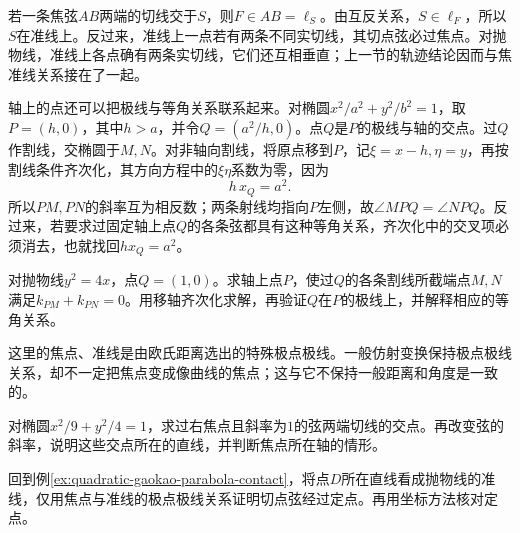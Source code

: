 若一条焦弦\(AB\)两端的切线交于\(S\)，则\(F\in AB=\ell_S\)。由互反关系，\(S\in\ell_F\)，所以\(S\)在准线上。反过来，准线上一点若有两条不同实切线，其切点弦必过焦点。对抛物线，准线上各点确有两条实切线，它们还互相垂直；上一节的轨迹结论因而与焦准线关系接在了一起。

轴上的点还可以把极线与等角关系联系起来。对椭圆\(x^2/a^2+y^2/b^2=1\)，取\(P=(h,0)\)，其中\(h>a\)，并令\(Q=(a^2/h,0)\)。点\(Q\)是\(P\)的极线与轴的交点。过\(Q\)作割线，交椭圆于\(M,N\)。对非轴向割线，将原点移到\(P\)，记\(\xi=x-h,\eta=y\)，再按割线条件齐次化，其方向方程中的\(\xi\eta\)系数为零，因为
\begin{equation*}
 h\,x_Q=a^2.
\end{equation*}
所以\(PM,PN\)的斜率互为相反数；两条射线均指向\(P\)左侧，故\(\angle MPQ=\angle NPQ\)。反过来，若要求过固定轴上点\(Q\)的各条弦都具有这种等角关系，齐次化中的交叉项必须消去，也就找回\(h x_Q=a^2\)。

\par\noindent\begin{minipage}{\linewidth}
\begin{example}
对抛物线\(y^2=4x\)，点\(Q=(1,0)\)。求轴上点\(P\)，使过\(Q\)的各条割线所截端点\(M,N\)满足\(k_{PM}+k_{PN}=0\)。用移轴齐次化求解，再验证\(Q\)在\(P\)的极线上，并解释相应的等角关系。
\end{example}
\end{minipage}\par

这里的焦点、准线是由欧氏距离选出的特殊极点极线。一般仿射变换保持极点极线关系，却不一定把焦点变成像曲线的焦点；这与它不保持一般距离和角度是一致的。

\par\noindent\begin{minipage}{\linewidth}
\begin{example}
对椭圆\(x^2/9+y^2/4=1\)，求过右焦点且斜率为\(1\)的弦两端切线的交点。再改变弦的斜率，说明这些交点所在的直线，并判断焦点所在轴的情形。
\end{example}
\end{minipage}\par

\par\noindent\begin{minipage}{\linewidth}
\begin{example}
回到例\ref{ex:quadratic-gaokao-parabola-contact}，将点\(D\)所在直线看成抛物线的准线，仅用焦点与准线的极点极线关系证明切点弦经过定点。再用坐标方法核对定点。
\end{example}
\end{minipage}\par

